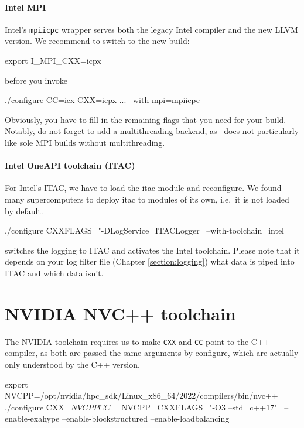 \paragraph{Intel MPI}
%
Intel's \texttt{mpiicpc} wrapper serves both the legacy Intel compiler and the
new LLVM version. 
We recommend to switch to the new build:

\begin{bash}
export I_MPI_CXX=icpx
\end{bash}

\noindent
before you invoke

\begin{bash}
./configure CC=icx CXX=icpx ... --with-mpi=mpiicpc
\end{bash}

\noindent
Obviously, you have to fill in the remaining flags that you need for your build.
Notably, do not forget to add a multithreading backend, as \Peano\ does not
particularly like sole MPI builds without multithreading.



\paragraph{Intel OneAPI toolchain (ITAC)}
% 
For Intel's ITAC, we have to load the itac module and reconfigure.
We found many supercomputers to deploy itac to modules of its own, i.e.~it is
not loaded by default.


\begin{bash}
./configure CXXFLAGS="-DLogService=ITACLogger \
 --with-toolchain=intel
\end{bash}

\noindent
switches the logging to ITAC and activates the Intel toolchain.
Please note that it depends on your log filter file (Chapter
\ref{section:logging}) what data is piped into ITAC and which data isn't.





\section{NVIDIA NVC++ toolchain}

The NVIDIA toolchain requires us to make \texttt{CXX}
and \texttt{CC} point to the C++ compiler, as both are passed the same
arguments by configure, which are actually only understood by the C++ version.

\begin{bash}
export NVCPP=/opt/nvidia/hpc_sdk/Linux_x86_64/2022/compilers/bin/nvc++
./configure CXX=$NVCPP CC=$NVCPP \
 CXXFLAGS="-O3 --std=c++17" \
 --enable-exahype --enable-blockstructured --enable-loadbalancing
\end{bash}

